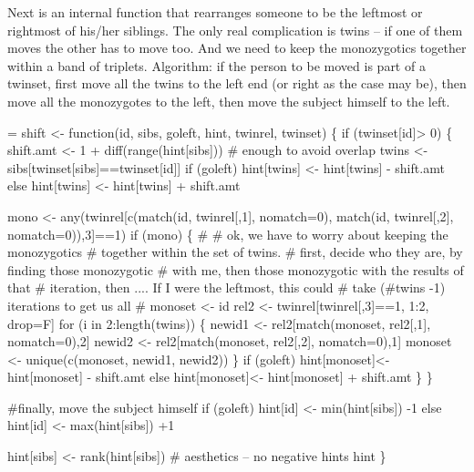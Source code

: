 \documentclass{article}
\begin{document}
Next is an internal function that  rearranges someone to be
the leftmost or rightmost of his/her siblings.  The only
real complication is twins -- if one of them moves the other has to move too.  
And we need to keep the monozygotics together within a band of triplets.
Algorithm: if the person to be moved is part of a twinset, 
first move all the twins to the left end (or right
as the case may be), then move all the monozygotes to the
left, then move the subject himself to the left.
\begin{nwchunk}
=
 shift <- function(id, sibs, goleft, hint, twinrel, twinset) \{
     if (twinset[id]> 0)  \{ 
         shift.amt <- 1 + diff(range(hint[sibs]))  # enough to avoid overlap
         twins <- sibs[twinset[sibs]==twinset[id]]
         if (goleft) 
              hint[twins] <- hint[twins] - shift.amt
         else hint[twins] <- hint[twins] + shift.amt
                 
         mono  <- any(twinrel[c(match(id, twinrel[,1], nomatch=0),
                                match(id, twinrel[,2], nomatch=0)),3]==1)
         if (mono) \{
             #
             # ok, we have to worry about keeping the monozygotics
             #  together within the set of twins.
             # first, decide who they are, by finding those monozygotic
             #  with me, then those monozygotic with the results of that
             #  iteration, then ....  If I were the leftmost, this could
             #  take (#twins -1) iterations to get us all
             #
             monoset <- id
             rel2 <- twinrel[twinrel[,3]==1, 1:2, drop=F]
             for (i in 2:length(twins)) \{
                 newid1 <- rel2[match(monoset, rel2[,1], nomatch=0),2]
                 newid2 <- rel2[match(monoset, rel2[,2], nomatch=0),1]
                 monoset <- unique(c(monoset, newid1, newid2))
                 \}
             if (goleft) 
                    hint[monoset]<- hint[monoset] - shift.amt
             else   hint[monoset]<- hint[monoset] + shift.amt
             \}
         \}
 
     #finally, move the subject himself
     if (goleft) hint[id] <- min(hint[sibs]) -1   
     else        hint[id] <- max(hint[sibs]) +1
 
     hint[sibs] <- rank(hint[sibs])  # aesthetics -- no negative hints
     hint
     \}
\end{nwchunk}
\end{document}
